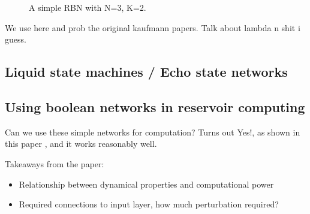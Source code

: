 \begin{figure}
  \caption{A simple RBN with N=3, K=2.}
\end{figure}


We use \cite{gershenson2004introduction} here and prob the original kaufmann papers.
Talk about lambda n shit i guess.


\subsection{Liquid state machines / Echo state networks}

\subsection{Using boolean networks in reservoir computing}

Can we use these simple networks for computation?
Turns out Yes!, as shown in this paper \cite{rbn-reservoir}, and it works reasonably well.

Takeaways from the paper:
\begin{itemize}
  \item Relationship between dynamical properties and computational power
  \item Required connections to input layer, how much perturbation required?
\end{itemize}

